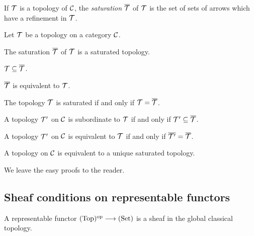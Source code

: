 \begin{2   CONTRAVARIANT FUNCTORS}
\begin{2.3 Sheaves in Grothendieck topologies}
\begin{definition}
If $\mathcal{T}$ is a topology of $\mathcal{C}$, the \emph{saturation}%
%
 $\overline{\mathcal{T}}$ of $\mathcal{T}$ is the set of sets of arrows which have a refinement in $\mathcal{T}$.
\end{definition}


\begin{proposition}
Let $\mathcal{T}$ be a topology on a category $\mathcal{C}$.

\begin{enumeratei}

\item The saturation $\overline{\mathcal{T}}$ of $\mathcal{T}$ is a saturated topology.

\item $\mathcal{T} \subseteq \overline{\mathcal{T}}$.

\item $\overline{\mathcal{T}}$ is equivalent to $\mathcal{T}$.

\item The topology $\mathcal{T}$ is saturated if and only if $\mathcal{T} = \overline{\mathcal{T}}$.

\item A topology $\mathcal{T}'$ on $\mathcal{C}$ is subordinate to $\mathcal{T}$ if and only if $\mathcal{T}' \subseteq \overline{\mathcal{T}}$.

\item A topology $\mathcal{T}'$ on $\mathcal{C}$ is equivalent to $\mathcal{T}$ if and only if $\overline{\mathcal{T}'} =
\overline{\mathcal{T}}$.

\item A topology on $\mathcal{C}$ is equivalent to a unique saturated topology.

\end{enumeratei}
\end{proposition}

We leave the easy proofs to the reader.




\subsection{Sheaf conditions on representable functors}


\begin{proposition}\label{prop:rep->sheaf}
A representable functor $\cattop\op \arr \catset$ is a sheaf in the global classical topology.
\end{proposition}


\end{2.3 Sheaves in Grothendieck topologies}
\end{2   CONTRAVARIANT FUNCTORS}
